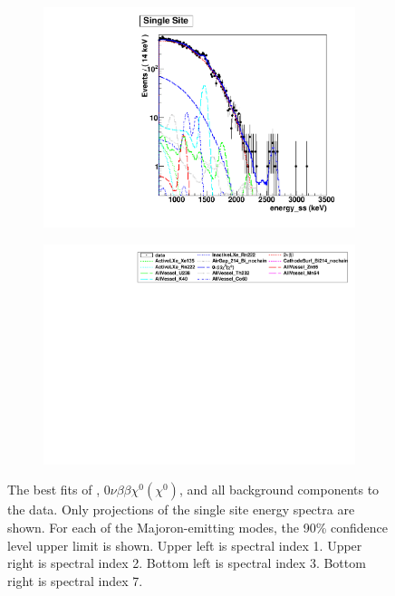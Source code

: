 \documentclass[herrin-thesis.tex]{subfiles}
\begin{document}
\begin{figure}[htbp]
\begin{subfigure}[c]{0.48\textwidth}
	\end{subfigure}\hfill%
	\begin{subfigure}[c]{0.48\textwidth}
	\centering
	\includegraphics[width=\textwidth]{./plots/analysis_bb0nX7_90_fit_e_ss.pdf}
	\end{subfigure}
	\begin{subfigure}[c]{\textwidth}
	\centering
	\includegraphics[width=\textwidth]{./plots/analysis_bb0nX_90_fit_legend.pdf}
	\end{subfigure}
\caption[Fits for \zeronuXpX{} with 90\% limits shown]{The best fits of \twonu{}, \(0\nu\beta\beta\chi^0(\chi^0)\), and all background components to the data. Only projections of the single site energy spectra are shown. For each of the Majoron-emitting modes, the 90\% confidence level upper limit is shown. Upper left is spectral index 1. Upper right is spectral index 2. Bottom left is spectral index 3. Bottom right is spectral index 7.}
\label{fig:analysis_bb0nX_best_fit}
\end{figure}
\end{document}
